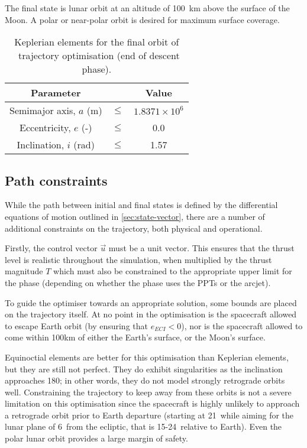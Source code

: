 The final state is lunar orbit at an altitude of 100~km above the surface of the Moon. A polar or near-polar orbit is desired for maximum surface coverage.

\begin{table}[h]
\caption{Keplerian elements for the final orbit of \BW\ trajectory optimisation (end of descent phase).}
\label{tab:Phase-5-constraints}
\centering
\begin{tabular} {ccc}\toprule
Parameter && Value\\\midrule
Semimajor axis, $a$ (m) &$\le$& $1.8371\times 10^6$\\
Eccentricity, $e$ (-) &$\le$& 0.0\\
Inclination, $i$ (rad) &$\le$& 1.57\\\bottomrule
\end{tabular}
\end{table}

\subsection{Path constraints} \label{sub:Path-constraints}

While the path between initial and final states is defined by the differential equations of motion outlined in \autoref{sec:state-vector}, there are a number of additional constraints on the trajectory, both physical and operational.

Firstly, the control vector $\vec{u}$ must be a unit vector. This ensures that the thrust level is realistic throughout the simulation, when multiplied by the thrust magnitude $T$ which must also be constrained to the appropriate upper limit for the phase (depending on whether the phase uses the PPTs or the arcjet).

To guide the optimiser towards an appropriate solution, some bounds are placed on the trajectory itself. At no point in the optimisation is the spacecraft allowed to escape Earth orbit (by ensuring that $e_{ECI}<0$), nor is the spacecraft allowed to come within 100km of either the Earth's surface, or the Moon's surface.

Equinoctial elements are better for this optimisation than Keplerian elements, but they are still not perfect. They do exhibit singularities as the inclination approaches 180\degrees; in other words, they do not model strongly retrograde orbits well. Constraining the trajectory to keep away from these orbits is not a severe limitation on this optimisation since the spacecraft is highly unlikely to approach a retrograde orbit prior to Earth departure (starting at 21\degrees\ while aiming for the lunar plane of 6\degrees\ from the ecliptic, that is 15-24\degrees\ relative to Earth). Even the polar lunar orbit provides a large margin of safety.

